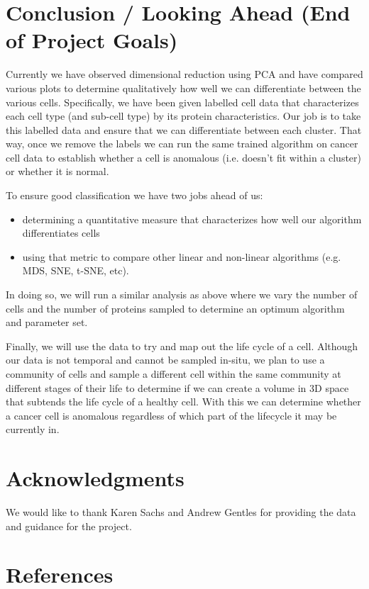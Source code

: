 \documentclass{article} %
\begin{document}
\section{Conclusion / Looking Ahead (End of Project Goals)}
Currently we have observed dimensional reduction using PCA and have compared various plots to determine qualitatively how well we can differentiate between the various cells. Specifically, we have been given labelled cell data that characterizes each cell type (and sub-cell type) by its protein characteristics. Our job is to take this labelled data and ensure that we can differentiate between each cluster. That way, once we remove the labels we can run the same trained algorithm on cancer cell data to establish whether a cell is anomalous (i.e. doesn't fit within a cluster) or whether it is normal. 

To ensure good classification we have two jobs ahead of us: \\
\begin{itemize}
\item determining a quantitative measure that characterizes how well our algorithm differentiates cells 
\item using that metric to compare other linear and non-linear algorithms (e.g. MDS, SNE, t-SNE, etc). 
\end{itemize}
In doing so, we will run a similar analysis as above where we vary the number of cells and the number of proteins sampled to determine an optimum algorithm and parameter set. 

Finally, we will use the data to try and map out the life cycle of a cell. Although our data is not temporal and cannot be sampled in-situ, we plan to use a community of cells and sample a different cell within the same community at different stages of their life to determine if we can create a volume in 3D space that subtends the life cycle of a healthy cell. With this we can determine whether a cancer cell is anomalous regardless of which part of the lifecycle it may be currently in. 

\section*{Acknowledgments}

We would like to thank Karen Sachs and Andrew Gentles for providing the data and guidance for the project. 

\section*{References}
\end{document}
